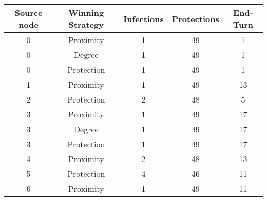\documentclass[results.tex]{subfiles}
\begin{document}
    \begin{center}
        \begin{tabular}{| c || c | c | c | c |}
            \hline
            {\bfseries Source node} & {\bfseries Winning Strategy} & {\bfseries Infections} & {\bfseries Protections}
            & {\bfseries End-Turn}
            \\  %
            \hline\hline
            0                       & Proximity                    & 1                      & 49                      & 1                    \\
            \hline
            0                       & Degree                       & 1                      & 49                      & 1                    \\
            \hline
            0                       & Protection                   & 1                      & 49                      & 1                    \\
            \hline
            1                       & Proximity                    & 1                      & 49                      & 13                   \\
            \hline
            2                       & Protection                   & 2                      & 48                      & 5                    \\
            \hline
            3                       & Proximity                    & 1                      & 49                      & 17                   \\
            \hline
            3                       & Degree                       & 1                      & 49                      & 17                   \\
            \hline
            3                       & Protection                   & 1                      & 49                      & 17                   \\
            \hline
            4                       & Proximity                    & 2                      & 48                      & 13                   \\
            \hline
            5                       & Protection                   & 4                      & 46                      & 11                   \\
            \hline
            6                       & Proximity                    & 1                      & 49                      & 11                   \\

\end{tabular}
\end{center}
\end{document}
